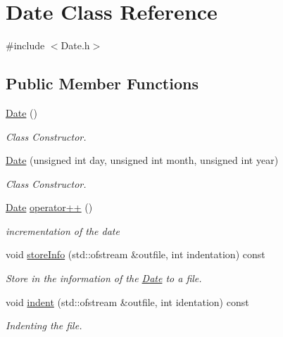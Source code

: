 \hypertarget{class_date}{}\section{Date Class Reference}
\label{class_date}


{\ttfamily \#include $<$Date.\+h$>$}

\subsection*{Public Member Functions}
\begin{DoxyCompactItemize}
\item 
\mbox{\label{class_date_a4e59ed4ba66eec61c27460c5d09fa1bd}} 
\mbox{\hyperlink{class_date_a4e59ed4ba66eec61c27460c5d09fa1bd}{Date}} ()
\begin{DoxyCompactList}\small\item\em Class Constructor. \end{DoxyCompactList}\item 
\mbox{\hyperlink{class_date_a28c6604a0f8ed8216becf24abc20cf5b}{Date}} (unsigned int day, unsigned int month, unsigned int year)
\begin{DoxyCompactList}\small\item\em Class Constructor. \end{DoxyCompactList}\item 
\mbox{\hyperlink{class_date}{Date}} \mbox{\hyperlink{class_date_a0c5386da90c6834a3e7a110b02e2abaa}{operator++}} ()
\begin{DoxyCompactList}\small\item\em incrementation of the date \end{DoxyCompactList}\item 
void \mbox{\hyperlink{class_date_a979593888deb70d07fd12f8f869a109c}{store\+Info}} (std\+::ofstream \&outfile, int indentation) const
\begin{DoxyCompactList}\small\item\em Store in the information of the \mbox{\hyperlink{class_date}{Date}} to a file. \end{DoxyCompactList}\item 
void \mbox{\hyperlink{class_date_a71cb9aebbc36dc421d720764cacd681a}{indent}} (std\+::ofstream \&outfile, int identation) const
\begin{DoxyCompactList}\small\item\em Indenting the file. \end{DoxyCompactList}\item 

\end{DoxyCompactItemize}

